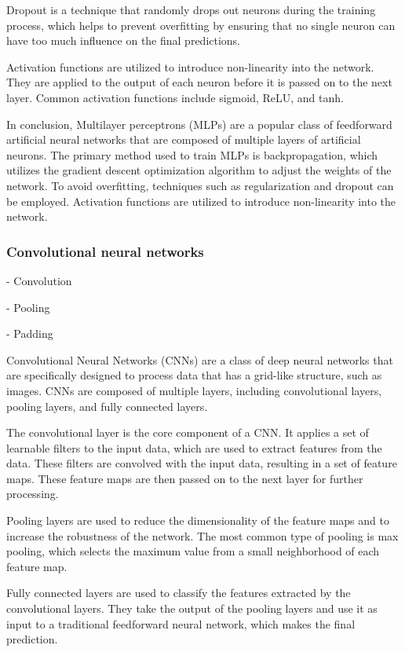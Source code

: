 Dropout is a technique that randomly drops out neurons during the training process, which helps to prevent overfitting by ensuring that no single neuron can have too much influence on the final predictions.

Activation functions are utilized to introduce non-linearity into the network. They are applied to the output of each neuron before it is passed on to the next layer. Common activation functions include sigmoid, ReLU, and tanh.

In conclusion, Multilayer perceptrons (MLPs) are a popular class of feedforward artificial neural networks that are composed of multiple layers of artificial neurons. The primary method used to train MLPs is backpropagation, which utilizes the gradient descent optimization algorithm to adjust the weights of the network. To avoid overfitting, techniques such as regularization and dropout can be employed. Activation functions are utilized to introduce non-linearity into the network.



\subsubsection{Convolutional neural networks}
- Convolution

- Pooling

- Padding


Convolutional Neural Networks (CNNs) are a class of deep neural networks that are specifically designed to process data that has a grid-like structure, such as images. CNNs are composed of multiple layers, including convolutional layers, pooling layers, and fully connected layers.

The convolutional layer is the core component of a CNN. It applies a set of learnable filters to the input data, which are used to extract features from the data. These filters are convolved with the input data, resulting in a set of feature maps. These feature maps are then passed on to the next layer for further processing.

Pooling layers are used to reduce the dimensionality of the feature maps and to increase the robustness of the network. The most common type of pooling is max pooling, which selects the maximum value from a small neighborhood of each feature map.

Fully connected layers are used to classify the features extracted by the convolutional layers. They take the output of the pooling layers and use it as input to a traditional feedforward neural network, which makes the final prediction.

